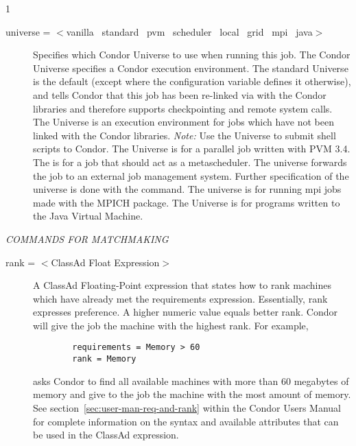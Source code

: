 \begin{ManPage}{\label{man-condor-submit}}{1}
\begin{description}

\item[universe = $<$vanilla \Bar\ standard \Bar\ pvm \Bar\ scheduler
\Bar\ local \Bar\ grid \Bar\ mpi \Bar\ java$>$]
\label{man-condor-submit-universe}
Specifies which Condor Universe to use when running this job.  The Condor
Universe specifies a Condor execution environment.  The standard
Universe is the default (except where the configuration variable
 defines it otherwise),
and tells Condor that this job has been re-linked
via  with the Condor libraries and therefore supports
checkpointing and remote system calls.  The  Universe is an
execution environment for jobs which have not been linked with the
Condor libraries.  \emph{Note:} Use the  Universe to
submit shell scripts to Condor.  The  Universe is for a
parallel job written with PVM 3.4. The  is for a job that
should act as a metascheduler.
The  universe forwards the job to an external job
management system.
Further specification of the  universe is done with the
 command.
The  universe is
for running mpi jobs made with the MPICH package.
The  Universe is for programs written to the Java Virtual Machine.

\end{description} 


\emph{COMMANDS FOR MATCHMAKING}
\begin{description} 


\item[rank = $<$ClassAd Float Expression$>$]
A ClassAd Floating-Point
expression that states how to rank machines which have already met the requirements
expression. Essentially, rank expresses preference.  A higher numeric value
equals better rank. Condor will give the job the machine with the
highest rank.  For example,
\begin{verbatim}
        requirements = Memory > 60
        rank = Memory
\end{verbatim}
asks Condor to find all available machines with more than 60 megabytes of memory
and give to the job the machine with the most amount of memory.
See section~\ref{sec:user-man-req-and-rank} 
within the Condor Users
Manual for complete information on the syntax and available attributes
that can be used in the ClassAd expression.


\end{description}
\end{ManPage}
